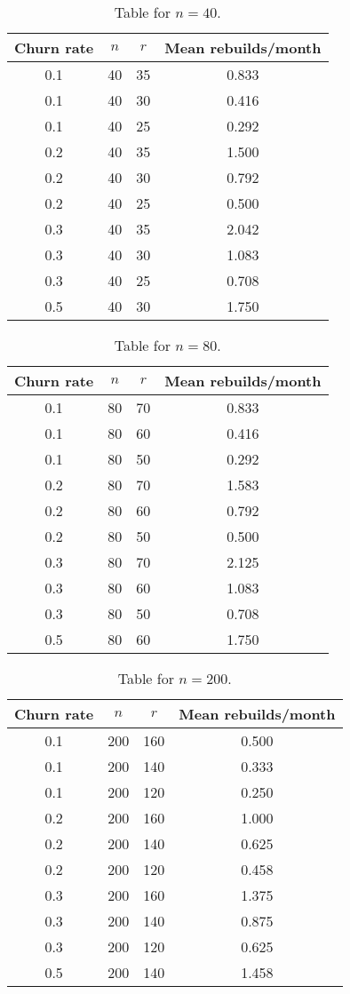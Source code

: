 \begin{table}[H]\centering


\begin{tabular}{| c | c c | c |}\hline
Churn rate & $n$ & $r$ &Mean rebuilds/month \\ \hline
0.1 & 40 & 35 & 0.833 \\  0.1 & 40 & 30 & 0.416 \\  0.1 & 40 & 25 & 0.292 \\\hline 
0.2 & 40 & 35 & 1.500 \\  0.2 & 40 & 30 & 0.792 \\  0.2 & 40 & 25 & 0.500 \\\hline 
0.3 & 40 & 35 & 2.042 \\  0.3 & 40 & 30 & 1.083 \\  0.3 & 40 & 25 & 0.708 \\\hline
0.5 & 40 & 30 & 1.750 \\ \hline
\end{tabular}
\caption{Table for $n=40$.}\label{table:n=40}
\end{table}

\begin{table}[H]\centering
\begin{tabular}{| c | c c | c |}\hline
Churn rate & $n$ & $r$ &Mean rebuilds/month \\\hline 
0.1 & 80 & 70 & 0.833 \\  0.1 & 80 & 60 & 0.416 \\  0.1 & 80 & 50 & 0.292 \\\hline 
0.2 & 80 & 70 & 1.583 \\  0.2 & 80 & 60 & 0.792 \\  0.2 & 80 & 50 & 0.500 \\\hline
0.3 & 80 & 70 & 2.125 \\  0.3 & 80 & 60 & 1.083 \\  0.3 & 80 & 50 & 0.708 \\\hline
0.5 & 80 & 60 & 1.750 \\ \hline
\end{tabular}
\caption{Table for $n=80$.}\label{table:n=80}
\end{table}

\begin{table}[H]\centering
\begin{tabular}{| c | c c | c |}\hline
Churn rate & $n$ & $r$ &Mean rebuilds/month \\\hline 
0.1 & 200 & 160 & 0.500 \\  0.1 & 200 & 140 & 0.333 \\  0.1 & 200 & 120 & 0.250 \\\hline 
0.2 & 200 & 160 & 1.000 \\  0.2 & 200 & 140 & 0.625 \\  0.2 & 200 & 120 & 0.458 \\\hline
0.3 & 200 & 160 & 1.375 \\  0.3 & 200 & 140 & 0.875 \\  0.3 & 200 & 120 & 0.625 \\\hline
0.5 & 200 & 140 & 1.458 \\\hline
\end{tabular}
\caption{Table for $n=200$.}\label{table:n=200}
\end{table}